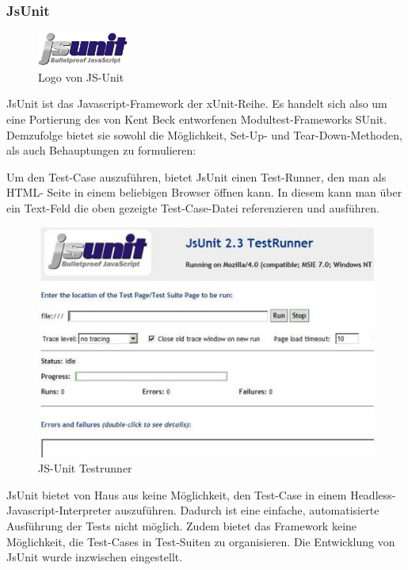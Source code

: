 \subsubsection{JsUnit}
\begin{figure}[!ht]
  \begin{center}
    \includegraphics[width=3cm]{bilder/jsunit.jpg}
    \caption{Logo von JS-Unit}
    \label{an_tranciver}
  \end{center}
\end{figure}
JsUnit ist das Javascript-Framework der xUnit-Reihe. Es handelt sich also um eine Portierung des von Kent Beck entworfenen Modultest-Frameworks SUnit. Demzufolge bietet sie sowohl die Möglichkeit, Set-Up- und Tear-Down-Methoden, als auch Behauptungen zu formulieren:

Um den Test-Case auszuführen, bietet JsUnit einen Test-Runner, den man als HTML- Seite in einem beliebigen Browser öffnen kann. In diesem kann man über ein Text-Feld die oben gezeigte Test-Case-Datei referenzieren und ausführen.
\begin{figure}[!ht]
  \begin{center}
    \includegraphics[width=12cm]{bilder/jsunit-testrunner.jpg}
    \caption{JS-Unit Testrunner}
    \label{an_tranciver}
  \end{center}
\end{figure}
JsUnit bietet von Haus aus keine Möglichkeit, den Test-Case in einem Headless- Javascript-Interpreter auszuführen. Dadurch ist eine einfache, automatisierte Ausführung der Tests nicht möglich. Zudem bietet das Framework keine Möglichkeit, die Test-Cases in Test-Suiten zu organisieren. Die Entwicklung von JsUnit wurde inzwischen eingestellt.

